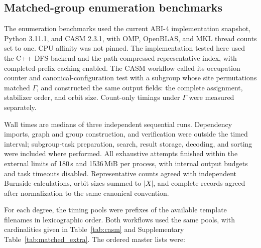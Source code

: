 \documentclass[a5paper, 10pt]{article}
\begin{document}
\begingroup\setlength{\emergencystretch}{3em}
\subsection{Matched-group enumeration benchmarks}
\label{app:enum_benchmark}

The enumeration benchmarks used the current ABI-4 implementation snapshot, Python 3.11.1, and CASM 2.3.1, with OMP, OpenBLAS, and MKL thread counts set to one. CPU affinity was not pinned. The implementation tested here used the C++ DFS backend and the path-compressed representative index, with completed-prefix caching enabled. The CASM workflow called its occupation counter and canonical-configuration test with a subgroup whose site permutations matched $\Gamma$, and constructed the same output fields: the complete assignment, stabilizer order, and orbit size. Count-only timings under $\Gamma$ were measured separately.

Wall times are medians of three independent sequential runs. Dependency imports, graph and group construction, and verification were outside the timed interval; subgroup-task preparation, search, result storage, decoding, and sorting were included where performed. All exhaustive attempts finished within the external limits of 180\,s and 1536\,MiB per process, with internal output budgets and task timeouts disabled. Representative counts agreed with independent Burnside calculations, orbit sizes summed to $|X|$, and complete records agreed after normalization to the same canonical convention.

For each degree, the timing pools were prefixes of the available template filenames in lexicographic order. Both workflows used the same pools, with cardinalities given in Table~\ref{tab:casm} and Supplementary Table~\ref{tab:matched_extra}. The ordered master lists were:
\end{document}
